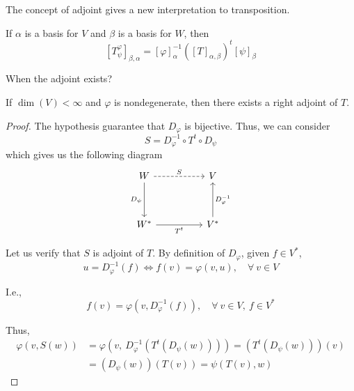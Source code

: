 The concept of adjoint gives a new interpretation to transposition.

\begin{lemma}\label{lm:202301041041}
  If $\alpha$ is a basis for $V$ and $\beta$ is a basis for $W$, then 
  \[
    [T_\psi^\varphi]_{\beta, \alpha} = [\varphi]_\alpha^{-1} ([T]_{\alpha, \beta})^t [\psi]_\beta
  \]
\end{lemma}

When the adjoint exists? 

\begin{theorem}\label{thm:202301041102}
  If $\dim(V) < \infty$ and $\varphi$ is nondegenerate, then there exists a right adjoint of $T$.
\end{theorem}

\begin{proof}
  The hypothesis guarantee that $D_\varphi$ is bijective. Thus, we can consider 
  \[
    S = D_\varphi^{-1} \circ T^t \circ D_\psi 
  \]
  which gives us the following diagram 
  \[\begin{tikzcd}
    W && V \\
    \\
    {W^\ast} && {V^\ast}
    \arrow["S", dashed, from=1-1, to=1-3]
    \arrow["{D_\psi}"', from=1-1, to=3-1]
    \arrow["{T^t}"', from=3-1, to=3-3]
    \arrow["{D_\varphi^{-1}}"', from=3-3, to=1-3]
  \end{tikzcd}\]

  Let us verify that $S$ is adjoint of $T$. By definition of $D_\varphi$, given $f \in V^\ast$, 
  \[
    u = D_\varphi^{-1}(f) \iff f(v) = \varphi(v,u), \quad \forall~v \in V
  \]

  I.e., 
  \[
    f(v) = \varphi(v, D_\varphi^{-1}(f)), \quad \forall~v \in V, ~f\in V^\ast
  \]

  Thus, 
  \begin{equation*}
    \begin{aligned}
      \varphi(v, S(w)) &= \varphi(v, ~D_\varphi^{-1}(T^t (D_\psi(w)))) = (T^t(D_\psi(w)))(v) \\
      &= (D_\psi(w))(T(v)) = \psi(T(v), w)
    \end{aligned}
  \end{equation*}
\end{proof}

